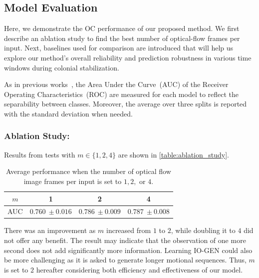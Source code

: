 \documentclass[letterpaper]{article} %
\let\orgautoref\autoref
\renewcommand{\autoref}
{\def\equationautorefname{Equation}%
	\def\figureautorefname{Fig.}%
	\def\subfigureautorefname{Fig.}%
	\def\Itemautorefname{item}%
	\def\tableautorefname{Table}%
	\def\exerciseautorefname{Exercise}%
	\def\starexerciseautorefname{Exercise}%
	\def\sectionautorefname{Section}%
	\def\subsectionautorefname{Section}%
	\def\subsubsectionautorefname{Section}%
	\def\chapterautorefname{Section}%
	\def\partautorefname{Part}%
	\orgautoref}
\begin{document}
\subsection{Model Evaluation}
\label{sec:model_evaluation}

Here, we demonstrate the OC performance of our proposed method. We first
describe an ablation study to find the best number of optical-flow
frames per input. Next, baselines used for comparison are introduced
that will help us explore our method's overall reliability and
prediction robustness in various time windows during colonial
stabilization.

As in previous works~\citep{RVGDSBMK18}, the Area Under the Curve~(AUC)
of the Receiver Operating Characteristics~(ROC) are measured for
each model to reflect the separability between classes. Moreover,
the average over three splits is reported with the standard
deviation when needed.

\subsubsection{Ablation Study:}
\label{sec:ablation_study}
%
Results from tests with $m \in \{1, 2, 4\}$ are shown in
\autoref{table:ablation_study}.
%
\setlength{\tabcolsep}{0.5em} %
{\renewcommand{\arraystretch}{1.2}%
	\begin{table}
		\centering
		\begin{tabular}{|c|c|c|c|}
			\hline
			$m$  &  1 & 2 & 4  \\ \hline\hline
			AUC & $0.760~\pm 0.016$ & $0.786~\pm 0.009$ & $0.787~\pm 0.008$
			\\ \hline
		\end{tabular}
		\caption{Average performance when the number of optical flow
		image frames per input is set to $1, 2,$ or $4$.}
		\label{table:ablation_study}
	\end{table}
}%
There was an improvement as $m$ increased from $1$ to $2$,
while doubling it to $4$ did not offer any benefit. The result may
indicate that the observation of one more second does not add
significantly more information. Learning \mbox{IO-GEN} could also be more
challenging as it is asked to generate longer motional sequences.  Thus,
$m$ is set to $2$ hereafter considering both efficiency and
effectiveness of our model.
\end{document}
